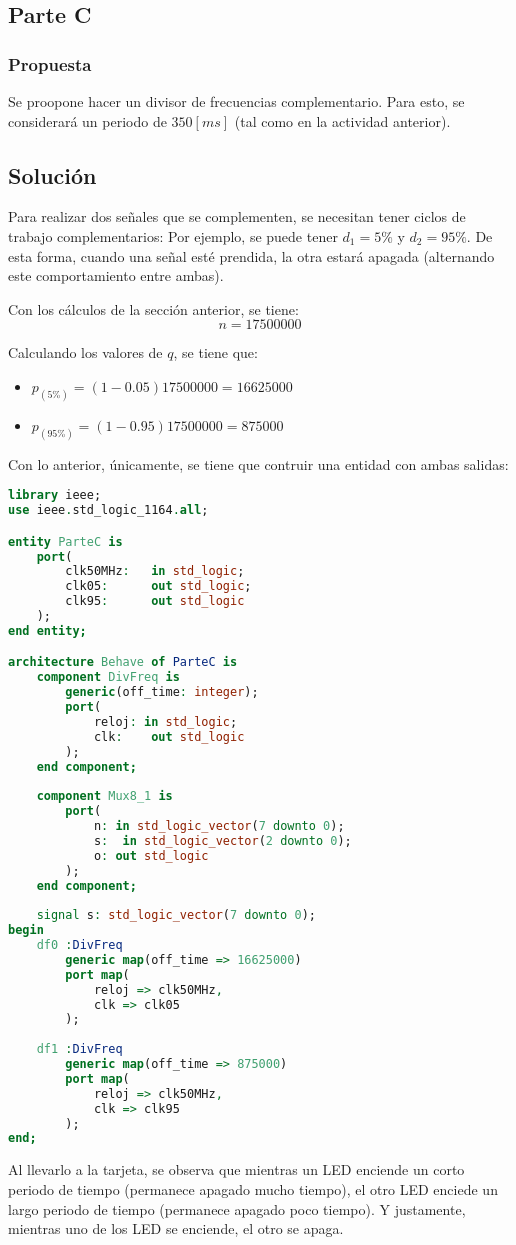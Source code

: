 \documentclass[../procedimientos.tex]{subfiles}
\begin{document}
\clearpage
\subsection{Parte C}
\subsubsection*{Propuesta}
\begin{em}
  Se proopone hacer un divisor de frecuencias complementario. Para esto, se 
  considerará un periodo de $350 [ms]$ (tal como en la actividad anterior).
\end{em}

\subsection*{Solución}
Para realizar dos señales que se complementen, se necesitan tener ciclos de 
trabajo complementarios: Por ejemplo, se puede tener $d_1 = 5\%$ y $d_2 = 
95\%$. De esta forma, cuando una señal esté prendida, la otra estará apagada 
(alternando este comportamiento entre ambas).

Con los cálculos de la sección anterior, se tiene:
\[ n = 17500000 \]

Calculando los valores de $q$, se tiene que:
\begin{itemize}
  \item $p_{(5\%)}  = (1 - 0.05) 17500000 = 16625000$
  \item $p_{(95\%)} = (1 - 0.95) 17500000 =   875000$
\end{itemize}

Con lo anterior, únicamente, se tiene que contruir una entidad con ambas 
salidas:
\begin{lstlisting}[language=vhdl]
library ieee;
use ieee.std_logic_1164.all;

entity ParteC is
	port(
		clk50MHz:	in std_logic;
		clk05: 		out std_logic;
		clk95: 		out std_logic
	);
end entity;

architecture Behave of ParteC is
	component DivFreq is
		generic(off_time: integer);
		port(
			reloj: in std_logic;
			clk:	out std_logic
		);
	end component;
	
	component Mux8_1 is
		port(
			n: in std_logic_vector(7 downto 0);
			s:	in std_logic_vector(2 downto 0);
			o: out std_logic
		);
	end component;
	
	signal s: std_logic_vector(7 downto 0);
begin
	df0 :DivFreq
		generic map(off_time => 16625000)
		port map(
			reloj => clk50MHz,
			clk => clk05
		);
	
	df1 :DivFreq
		generic map(off_time => 875000)
		port map(
			reloj => clk50MHz,
			clk => clk95
		);
end;
\end{lstlisting}

Al llevarlo a la tarjeta, se observa que mientras un LED enciende un corto 
periodo de tiempo (permanece apagado mucho tiempo), el otro LED enciede un 
largo periodo de tiempo (permanece apagado poco tiempo). Y justamente, 
mientras uno de los LED se enciende, el otro se apaga.
\end{document}
